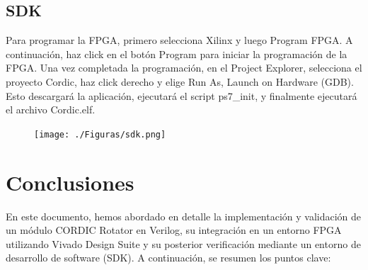 \documentclass[12pt,a4paper, twoside]{article} %
\begin{document}
\subsection{SDK}

Para programar la FPGA, primero selecciona Xilinx y luego Program FPGA. A continuación, haz click en el botón Program para iniciar la programación de la FPGA. Una vez completada la programación, en el Project Explorer, selecciona el proyecto Cordic, haz click derecho y elige Run As, Launch on Hardware (GDB). Esto descargará la aplicación, ejecutará el script ps7\_init, y finalmente ejecutará el archivo Cordic.elf.

\begin{figure}[ht]
\centering
\texttt{[image: ./Figuras/sdk.png]}
\label{fig:SDK}
\end{figure}

\newpage

\section{Conclusiones}

En este documento, hemos abordado en detalle la implementación y validación de un módulo CORDIC Rotator en Verilog, su integración en un entorno FPGA utilizando Vivado Design Suite y su posterior verificación mediante un entorno de desarrollo de software (SDK). A continuación, se resumen los puntos clave:
\end{document}
